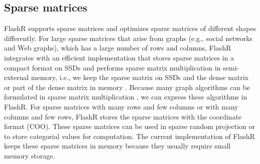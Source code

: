 
\subsection{Sparse matrices}
FlashR supports sparse matrices and optimizes sparse matrices of different
shapes differently.
For large sparse matrices that arise from graphs (e.g., social networks
and Web graphs), which has a large number of rows and columns, FlashR integrates
with an efficient implementation that stores sparse matrices
in a compact format on SSDs and performs sparse matrix multiplication
in semi-external memory, i.e., we keep the sparse matrix on SSDs and
the dense matrix or part of the dense matrix in memory \cite{SEM_SpMM}.
Because many graph algorithms can be formulated in sparse matrix multiplication
\cite{linear_algebra}, we can express these algorithms in FlashR.
For sparse matrices with many rows and few columns or with many columns
and few rows, FlashR stores the sparse matrices with the coordinate format
(COO). These sparse matrices can be used in sparse random projection
\cite{sparse_proj} or to store categorial values for computation.
The current implementation of FlashR keeps these sparse matrices in memory
because they usually require small memory storage.

